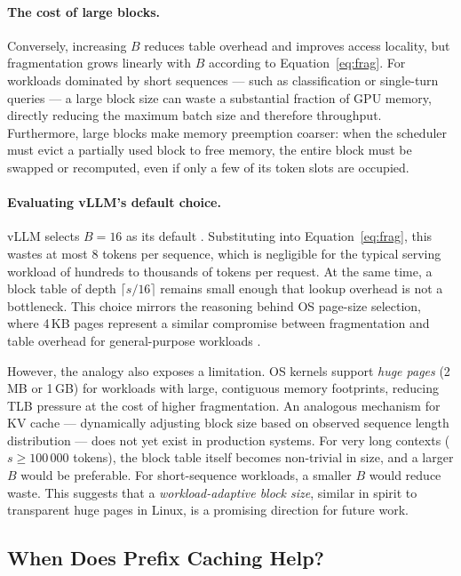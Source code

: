 \documentclass[10pt, a4paper]{article}
\begin{document}
\paragraph{The cost of large blocks.}
Conversely, increasing $B$ reduces table overhead and improves access
locality, but fragmentation grows linearly with $B$ according to
Equation~\ref{eq:frag}.
For workloads dominated by short sequences --- such as classification or
single-turn queries --- a large block size can waste a substantial
fraction of GPU memory, directly reducing the maximum batch size and
therefore throughput.
Furthermore, large blocks make memory preemption coarser: when the
scheduler must evict a partially used block to free memory, the entire
block must be swapped or recomputed, even if only a few of its token
slots are occupied.

\paragraph{Evaluating vLLM's default choice.}
vLLM selects $B = 16$ as its default \cite{kwon2023vllm}.
Substituting into Equation~\ref{eq:frag}, this wastes at most 8 tokens
per sequence, which is negligible for the typical serving workload of
hundreds to thousands of tokens per request.
At the same time, a block table of depth $\lceil s/16 \rceil$ remains
small enough that lookup overhead is not a bottleneck.
This choice mirrors the reasoning behind OS page-size selection, where
4\,KB pages represent a similar compromise between fragmentation and
table overhead for general-purpose workloads \cite{silberschatz2018os}.

However, the analogy also exposes a limitation.
OS kernels support \emph{huge pages} (2\,MB or 1\,GB) for workloads
with large, contiguous memory footprints, reducing TLB pressure at the
cost of higher fragmentation.
An analogous mechanism for KV cache --- dynamically adjusting block
size based on observed sequence length distribution --- does not yet
exist in production systems.
For very long contexts ($s \geq 100\,000$ tokens), the block table itself
becomes non-trivial in size, and a larger $B$ would be preferable.
For short-sequence workloads, a smaller $B$ would reduce waste.
This suggests that a \emph{workload-adaptive block size}, similar in
spirit to transparent huge pages in Linux, is a promising direction for
future work.
\subsection{When Does Prefix Caching Help?}
\end{document}
